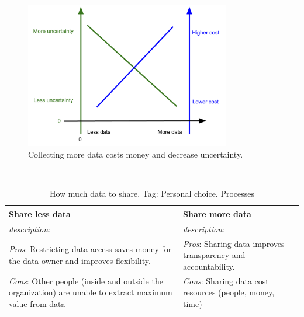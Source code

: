 \begin{center}
    \begin{figure}
        \centering
        \includegraphics[width=0.8\textwidth]{images/cost_and_uncertainty_for_data_collection}
        \caption{Collecting more data costs money and decrease uncertainty.}
        \label{fig:my_label}
    \end{figure}
\end{center}

 \ \\

\begin{center}
\begin{table}[ht]
\begin{tabular}{ | m{\dilemmatablewidth}| m{\dilemmatablewidth} | } 
  \hline
  \textbf{Share less data} &
  \textbf{Share more data} \\
  \hline
  \textit{description}:  &
  \textit{description}:  \\  
  \hline
  \textit{Pros}: Restricting data access saves money for the data owner and improves flexibility.&
  \textit{Pros}: Sharing data improves transparency and accountability. \\
  \hline
  \textit{Cons}: Other people (inside and outside the organization) are unable to extract maximum value from data & 
  \textit{Cons}: Sharing data cost resources (people, money, time) \\
  \hline
\end{tabular}
\caption{How much data to share.
{\tiny Tag: Personal choice.  Processes}
}
\label{table:data_share-vs-hide}
\end{table}
\end{center}

\ \\


